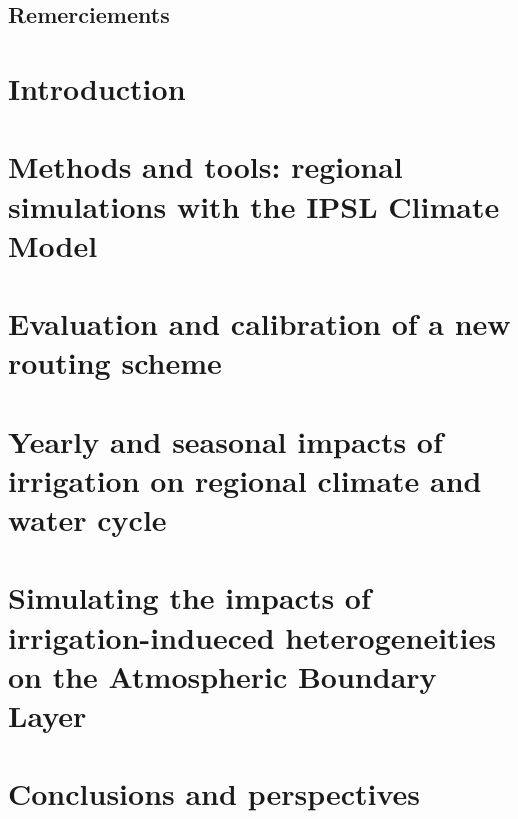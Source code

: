 \documentclass{report}
\begin{document}
\section*{Remerciements}

\clearpage
\dominitoc
\renewcommand*\contentsname{Contents}
\tableofcontents
\newpage

\chapter{Introduction}
\minitoc


\chapter{Methods and tools: regional simulations with the IPSL Climate Model}
\minitoc


\chapter{Evaluation and calibration of a new routing scheme}
\minitoc


\chapter{Yearly and seasonal impacts of irrigation on regional climate and water cycle}
\minitoc


\chapter{Simulating the impacts of irrigation-indueced heterogeneities on the Atmospheric Boundary Layer}
\minitoc


\chapter{Conclusions and perspectives}

\newpage

\printbibliography

\listoffigures
\newpage
\listoftables
\end{document}
